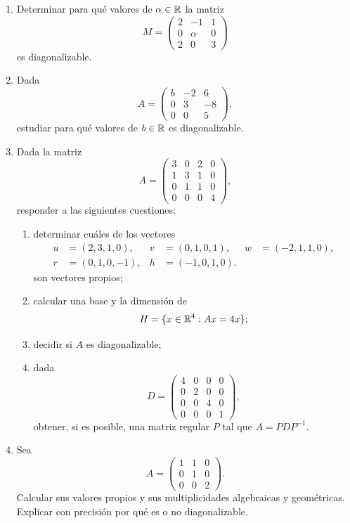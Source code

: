\begin{enumerate}
\item Determinar para qué valores de $\alpha\in\mathbb{R}$ la matriz
\[
M=\begin{pmatrix}
2&-1&1\\
0&\alpha&0\\
2&0&3
\end{pmatrix}
\]
es diagonalizable.

\item Dada
\[
A=\begin{pmatrix}
b&-2&6\\
0&3&-8\\
0&0&5
\end{pmatrix},
\]
estudiar para qué valores de $b\in\mathbb{R}$ es diagonalizable.

\item Dada la matriz
\[
A=\begin{pmatrix}
3&0&2&0\\
1&3&1&0\\
0&1&1&0\\
0&0&0&4
\end{pmatrix},
\]
responder a las siguientes cuestiones:
\begin{enumerate}[label=\alph*)]
\item determinar cuáles de los vectores
\[
\begin{aligned}
u&=(2,3,1,0), & v&=(0,1,0,1), & w&=(-2,1,1,0),\\
r&=(0,1,0,-1), & h&=(-1,0,1,0). &&
\end{aligned}
\]
son vectores propios;
\item calcular una base y la dimensión de
\[
H=\{x\in\mathbb{R}^4:Ax=4x\};
\]
\item decidir si $A$ es diagonalizable;
\item dada
\[
D=\begin{pmatrix}
4&0&0&0\\
0&2&0&0\\
0&0&4&0\\
0&0&0&1
\end{pmatrix},
\]
obtener, si es posible, una matriz regular $P$ tal que $A=PDP^{-1}$.
\end{enumerate}

\item Sea
\[
A=\begin{pmatrix}
1&1&0\\
0&1&0\\
0&0&2
\end{pmatrix}.
\]
Calcular sus valores propios y sus multiplicidades algebraicas y geométricas. Explicar con precisión por qué es o no diagonalizable.


\end{enumerate}
